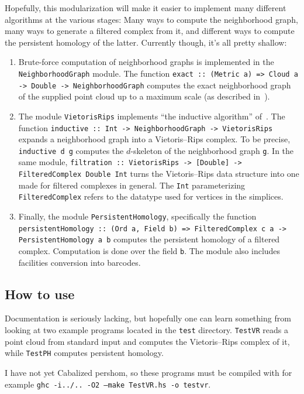 \documentclass[a4paper,10pt]{article}
\begin{document}
Hopefully, this modularization will make it easier to implement many
different algorithms at the various stages: Many ways to compute the
neighborhood graph, many ways to generate a filtered complex from it,
and different ways to compute the persistent homology of the
latter. Currently though, it's all pretty shallow:
\begin{enumerate}[label=\arabic*)]
  \item Brute-force computation of neighborhood graphs is implemented
    in the \texttt{NeighborhoodGraph} module. The function
    \texttt{exact :: (Metric a) => Cloud a -> Double ->
      NeighborhoodGraph} computes the exact neighborhood graph of the
    supplied point cloud up to a maximum scale (as described
    in~\citep{fcvr}).
  \item The module \texttt{VietorisRips} implements ``the inductive
    algorithm'' of~\citep{fcvr}. The function \texttt{inductive :: Int
      -> NeighborhoodGraph -> VietorisRips} expands a neighborhood
    graph into a Vietoris--Rips complex. To be precise,
    \texttt{inductive d g} computes the $d$-skeleton of the
    neighborhood graph \texttt{g}. In the same module,
    \texttt{filtration :: VietorisRips -> [Double] -> FilteredComplex
      Double Int} turns the Vietoris--Rips data structure into one
    made for filtered complexes in general. The \texttt{Int}
    parameterizing \texttt{FilteredComplex} refers to the datatype
    used for vertices in the simplices.
  \item Finally, the module \texttt{PersistentHomology}, specifically
    the function \texttt{persistentHomology :: (Ord a, Field b) =>
      FilteredComplex c a -> PersistentHomology a b} computes the
    persistent homology of a filtered complex. Computation is done
    over the field \texttt{b}. The module also includes facilities
    conversion into barcodes.
\end{enumerate}

\subsection{How to use}
Documentation is seriously lacking, but hopefully one can learn
something from looking at two example programs located in the
\texttt{test} directory. \texttt{TestVR} reads a point cloud from
standard input and computes the Vietoris--Rips complex of it, while
\texttt{TestPH} computes persistent homology.

I have not yet Cabalized pershom, so these programs must be compiled
with for example \texttt{ghc -i../.. -O2 --make TestVR.hs -o testvr}.
\end{document}
